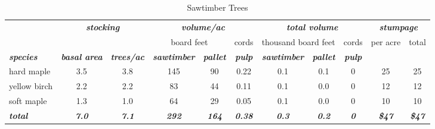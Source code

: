 \documentclass[landscape]{article}
\begin{document}
\begin{table}[H]

\caption{\label{tab:unnamed-chunk-40}Sawtimber Trees}
\fontsize{10}{12}\selectfont
\begin{tabular}[t]{lcccccccccc}
\toprule
\multicolumn{1}{c}{\em{\textbf{ }}} & \multicolumn{2}{c}{\em{\textbf{stocking}}} & \multicolumn{3}{c}{\em{\textbf{volume/ac }}} & \multicolumn{3}{c}{\em{\textbf{total volume}}} & \multicolumn{2}{c}{\em{\textbf{stumpage}}} \\
\cmidrule(l{3pt}r{3pt}){2-3} \cmidrule(l{3pt}r{3pt}){4-6} \cmidrule(l{3pt}r{3pt}){7-9} \cmidrule(l{3pt}r{3pt}){10-11}
\multicolumn{3}{c}{ } & \multicolumn{2}{c}{board feet} & \multicolumn{1}{c}{cords} & \multicolumn{2}{c}{thousand board feet} & \multicolumn{1}{c}{cords} & \multicolumn{1}{c}{per acre} & \multicolumn{1}{c}{total} \\
\cmidrule(l{3pt}r{3pt}){4-5} \cmidrule(l{3pt}r{3pt}){6-6} \cmidrule(l{3pt}r{3pt}){7-8} \cmidrule(l{3pt}r{3pt}){9-9} \cmidrule(l{3pt}r{3pt}){10-10} \cmidrule(l{3pt}r{3pt}){11-11}
\rowcolor[HTML]{DCDCDC}  \em{\textbf{species}} & \em{\textbf{basal area}} & \em{\textbf{trees/ac}} & \em{\textbf{sawtimber}} & \em{\textbf{pallet}} & \em{\textbf{pulp}} & \em{\textbf{sawtimber}} & \em{\textbf{pallet}} & \em{\textbf{pulp}} & \em{\textbf{ }} & \em{\textbf{ }}\\
\midrule
\rowcolor{gray!6}  hard maple & 3.5 & 3.8 & 145 & 90 & 0.22 & 0.1 & 0.1 & 0 & 25 & 25\\
 
yellow birch & 2.2 & 2.2 & 83 & 44 & 0.11 & 0.1 & 0.0 & 0 & 12 & 12\\
 
\rowcolor{gray!6}  soft maple & 1.3 & 1.0 & 64 & 29 & 0.05 & 0.1 & 0.0 & 0 & 10 & 10\\
 
\rowcolor[HTML]{DCDCDC}  \em{\textbf{total}} & \em{\textbf{7.0}} & \em{\textbf{7.1}} & \em{\textbf{292}} & \em{\textbf{164}} & \em{\textbf{0.38}} & \em{\textbf{0.3}} & \em{\textbf{0.2}} & \em{\textbf{0}} & \em{\textbf{\$47}} & \em{\textbf{\$47}}\\
\bottomrule
\end{tabular}
\end{table}
\end{document}
